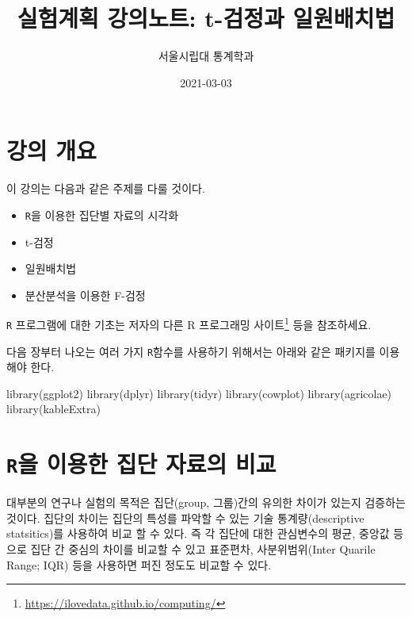 \documentclass[
]{book}
\title{실험계획 강의노트: t-검정과 일원배치법}
\author{서울시립대 통계학과}
\date{2021-03-03}
\newenvironment{Shaded}{\begin{snugshade}}{\end{snugshade}}
\newcommand{\FunctionTok}[1]{\textcolor[rgb]{0.00,0.00,0.00}{#1}}
\newcommand{\NormalTok}[1]{#1}
\providecommand{\tightlist}{%
  \setlength{\itemsep}{0pt}\setlength{\parskip}{0pt}}
\renewcommand{\href}[2]{#2\footnote{\url{#1}}}
\begin{document}
\maketitle

{
\setcounter{tocdepth}{1}
\tableofcontents
}
\hypertarget{uxac15uxc758-uxac1cuxc694}{%
\chapter*{강의 개요}\label{uxac15uxc758-uxac1cuxc694}}


이 강의는 다음과 같은 주제를 다룰 것이다.

\begin{itemize}
\tightlist
\item
  \texttt{R}을 이용한 집단별 자료의 시각화\\
\item
  t-검정
\item
  일원배치법
\item
  분산분석을 이용한 F-검정
\end{itemize}

\texttt{R} 프로그램에 대한 기초는 저자의 다른 \href{https://ilovedata.github.io/computing/}{R 프로그래밍 사이트} 등을 참조하세요.

다음 장부터 나오는 여러 가지 \texttt{R}함수를 사용하기 위해서는 아래와 같은 패키지를 이용해야 한다.

\begin{Shaded}
\begin{Highlighting}[]
\FunctionTok{library}\NormalTok{(ggplot2)}
\FunctionTok{library}\NormalTok{(dplyr)}
\FunctionTok{library}\NormalTok{(tidyr)}
\FunctionTok{library}\NormalTok{(cowplot)}
\FunctionTok{library}\NormalTok{(agricolae)}
\FunctionTok{library}\NormalTok{(kableExtra)}
\end{Highlighting}
\end{Shaded}

\mainmatter

\hypertarget{intro}{%
\chapter{\texorpdfstring{\texttt{R}을 이용한 집단 자료의 비교}{R을 이용한 집단 자료의 비교}}\label{intro}}

대부분의 연구나 실험의 목적은 집단(group, 그룹)간의 유의한 차이가 있는지 검증하는 것이다. 집단의 차이는 집단의 특성를 파악할 수 있는 기술 통계량(descriptive statsitics)를 사용하여 비교 할 수 있다. 즉 각 집단에 대한 관심변수의 평균, 중앙값 등으로 집단 간 중심의 차이를 비교할 수 있고 표준편차, 사분위범위(Inter Quarile Range; IQR) 등을 사용하면 퍼진 정도도 비교할 수 있다.
\end{document}
